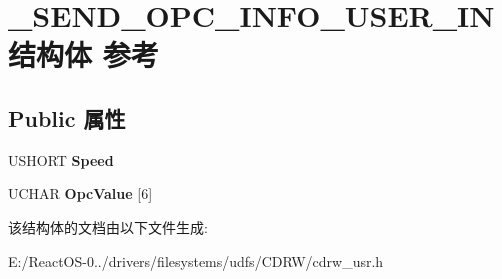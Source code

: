 \hypertarget{struct___s_e_n_d___o_p_c___i_n_f_o___u_s_e_r___i_n}{}\section{\+\_\+\+S\+E\+N\+D\+\_\+\+O\+P\+C\+\_\+\+I\+N\+F\+O\+\_\+\+U\+S\+E\+R\+\_\+\+I\+N结构体 参考}
\label{struct___s_e_n_d___o_p_c___i_n_f_o___u_s_e_r___i_n}
\subsection*{Public 属性}
\begin{DoxyCompactItemize}
\item 
\mbox{\label{struct___s_e_n_d___o_p_c___i_n_f_o___u_s_e_r___i_n_a9bb88741f04425a3f2be4d1bfb307c57}} 
U\+S\+H\+O\+RT {\bfseries Speed}
\item 
\mbox{\label{struct___s_e_n_d___o_p_c___i_n_f_o___u_s_e_r___i_n_aefac14c9f6137f5f37c3233f3b616bc0}} 
U\+C\+H\+AR {\bfseries Opc\+Value} \mbox{[}6\mbox{]}
\end{DoxyCompactItemize}


该结构体的文档由以下文件生成\+:\begin{DoxyCompactItemize}
\item 
E\+:/\+React\+O\+S-\/0../drivers/filesystems/udfs/\+C\+D\+R\+W/cdrw\+\_\+usr.\+h\end{DoxyCompactItemize}
